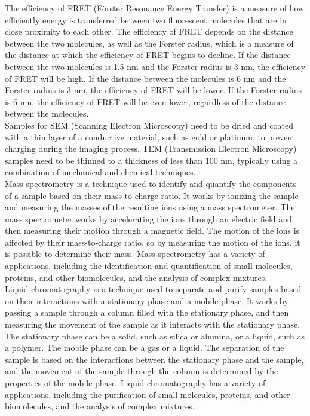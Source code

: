 \documentclass{article}
\begin{document}
The efficiency of FRET (Förster Resonance Energy Transfer) is a measure of how efficiently energy is transferred between two fluorescent molecules that are in close proximity to each other. The efficiency of FRET depends on the distance between the two molecules, as well as the Forster radius, which is a measure of the distance at which the efficiency of FRET begins to decline. If the distance between the two molecules is 1.5 nm and the Forster radius is 3 nm, the efficiency of FRET will be high. If the distance between the molecules is 6 nm and the Forster radius is 3 nm, the efficiency of FRET will be lower. If the Forster radius is 6 nm, the efficiency of FRET will be even lower, regardless of the distance between the molecules.\\

Samples for SEM (Scanning Electron Microscopy) need to be dried and coated with a thin layer of a conductive material, such as gold or platinum, to prevent charging during the imaging process. TEM (Transmission Electron Microscopy) samples need to be thinned to a thickness of less than 100 nm, typically using a combination of mechanical and chemical techniques.\\

Mass spectrometry is a technique used to identify and quantify the components of a sample based on their mass-to-charge ratio. It works by ionizing the sample and measuring the masses of the resulting ions using a mass spectrometer. The mass spectrometer works by accelerating the ions through an electric field and then measuring their motion through a magnetic field. The motion of the ions is affected by their mass-to-charge ratio, so by measuring the motion of the ions, it is possible to determine their mass. Mass spectrometry has a variety of applications, including the identification and quantification of small molecules, proteins, and other biomolecules, and the analysis of complex mixtures.\\

Liquid chromatography is a technique used to separate and purify samples based on their interactions with a stationary phase and a mobile phase. It works by passing a sample through a column filled with the stationary phase, and then measuring the movement of the sample as it interacts with the stationary phase. The stationary phase can be a solid, such as silica or alumina, or a liquid, such as a polymer. The mobile phase can be a gas or a liquid. The separation of the sample is based on the interactions between the stationary phase and the sample, and the movement of the sample through the column is determined by the properties of the mobile phase. Liquid chromatography has a variety of applications, including the purification of small molecules, proteins, and other biomolecules, and the analysis of complex mixtures.\\
\end{document}
